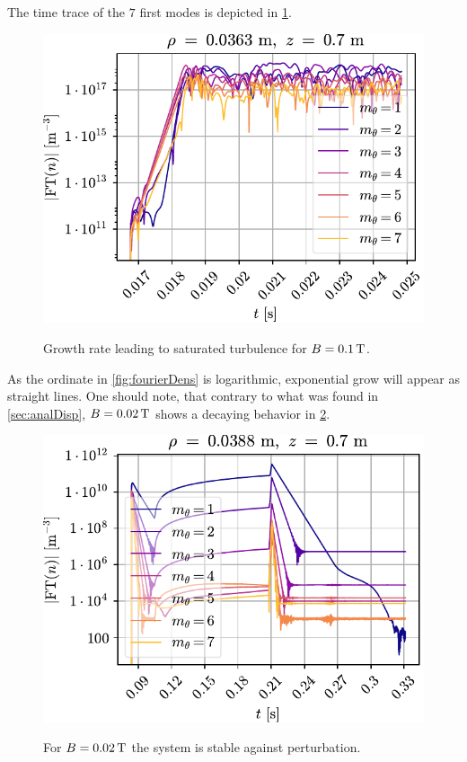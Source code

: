 The time trace of the $7$ first modes is depicted in \cref{fig:fourierUnstable}.
%
\begin{figure}[h!]
    \centering
    \includegraphics{fig/results/fourierModes/unstable}
    \label{fig:fourierUnstable}
    \caption{Growth rate leading to saturated turbulence for $B=0.1\, \text{T}$.}
\end{figure}
%
As the ordinate in \cref{fig:fourierDens} is logarithmic, exponential grow will appear as straight lines.
One should note, that contrary to what was found in \cref{sec:analDisp}, $B=0.02\, \text{T}$ shows a decaying behavior in \cref{fig:fourierStable}.
%
\begin{figure}[h!]
    \centering
    \includegraphics{fig/results/fourierModes/stable}
    \label{fig:fourierStable}
    \caption{For $B=0.02\, \text{T}$ the system is stable against perturbation.}
\end{figure}

